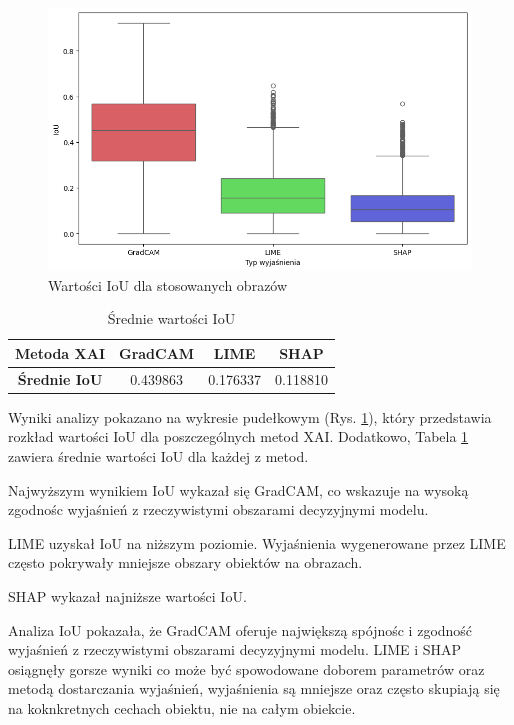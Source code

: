 \begin{figure}[h]
	\centering\includegraphics[width=.9\textwidth]{img/base_iou}
	\caption{Wartości IoU  dla stosowanych obrazów}  \label{rys:basiciou}
\end{figure}

\begin{table}[h]
	\centering
	\begin{tabular}{|c|c|c|c|}
		\hline
		\textbf{Metoda XAI}  & \textbf{GradCAM} & \textbf{LIME} & \textbf{SHAP} \\
		\hline
		\textbf{Średnie IoU} & 0.439863         & 0.176337      & 0.118810      \\
		\hline
	\end{tabular}
	\caption{Średnie wartości IoU}
	\label{tab:basiciou}
\end{table}


Wyniki analizy pokazano na wykresie pudełkowym (Rys. \ref{rys:basiciou}), który przedstawia rozkład wartości IoU dla poszczególnych metod XAI.
Dodatkowo, Tabela \ref{tab:basiciou} zawiera średnie wartości IoU dla każdej z metod.

Najwyższym wynikiem IoU wykazał się GradCAM, co wskazuje na wysoką zgodnośc wyjaśnień z rzeczywistymi obszarami decyzyjnymi modelu.

LIME uzyskał IoU na niższym poziomie.
Wyjaśnienia wygenerowane przez LIME często pokrywały mniejsze obszary obiektów na obrazach.

SHAP wykazał najniższe wartości IoU.

Analiza IoU pokazała, że GradCAM oferuje największą spójnośc i zgodność wyjaśnień z rzeczywistymi obszarami decyzyjnymi modelu.
LIME i SHAP osiągnęły gorsze wyniki co może być spowodowane doborem parametrów oraz metodą dostarczania wyjaśnień, wyjaśnienia są mniejsze oraz często skupiają się na koknkretnych cechach obiektu, nie na całym obiekcie.

